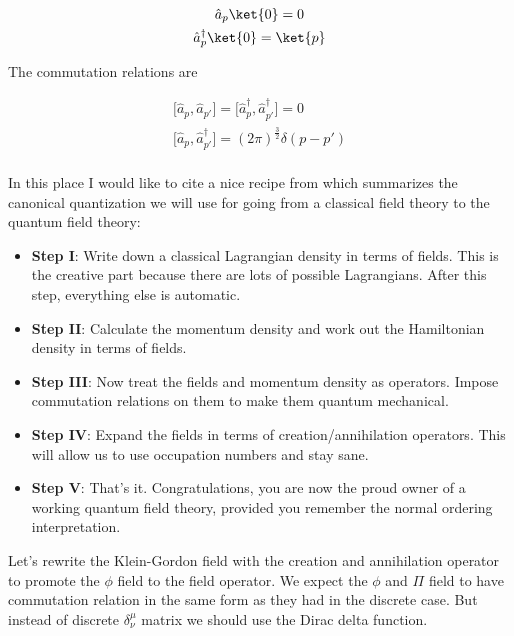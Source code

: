 \begin{equation*}
    \begin{gathered}
        \hat{a}_{p} \ket{0} = 0 \\
        \hat{a}^{\dagger}_{p} \ket{0} = \ket{p}
    \end{gathered}
\end{equation*}

The commutation relations are

\begin{equation*}
    \begin{gathered}
        \big[\hat{a}_{p}, \hat{a}_{p'}\big] = \big[\hat{a}_{p}^{\dagger}, \hat{a}_{p'}^{\dagger}\big] = 0 \\
        \big[\hat{a}_{p}, \hat{a}_{p'}^{\dagger}\big] = (2 \pi)^{\frac{3}{2}} \delta(p - p')
    \end{gathered}
\end{equation*}

\paragraph{} In this place I would like to cite a nice recipe from \cite{gifted_amateur} which summarizes
the canonical quantization we will use for going from a classical field theory to the quantum 
field theory:

\begin{itemize}
    \item \textbf{Step I}: Write down a classical Lagrangian density in terms of fields. This is the creative part because there are lots of 
        possible Lagrangians. After this step, everything else is automatic.
    \item \textbf{Step II}: Calculate the momentum density and work out the Hamiltonian density in terms of fields.
    \item \textbf{Step III}: Now treat the fields and momentum density as operators. Impose commutation relations on them to make them 
        quantum mechanical.
    \item \textbf{Step IV}: Expand the fields in terms of creation/annihilation operators. This will allow us to use occupation numbers 
        and stay sane.
    \item \textbf{Step V}: That's it. Congratulations, you are now the proud owner of a working quantum field theory, provided you remember 
        the normal ordering interpretation.
\end{itemize}

Let's rewrite the Klein-Gordon field with the creation and annihilation operator to promote the $\phi$ field to the field operator. We expect
the $\phi$ and $\Pi$ field to have commutation relation in the same form as they had in the discrete case. But instead of discrete $\delta^{\mu}_{\nu}$ matrix
we should use the Dirac delta function.

